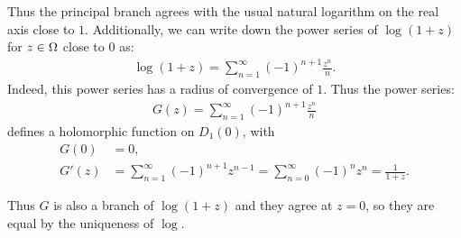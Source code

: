 Thus the principal branch agrees with the usual natural logarithm on the real axis close to $1$. Additionally, we can write down the power series of $\log(1+z)$ for $z \in \Omega$ close to $0$ as:
\begin{align*}
    \log(1+z) = \sum_{n=1}^\infty (-1)^{n+1} \frac{z^n}{n}.
\end{align*}
Indeed, this power series has a radius of convergence of $1$. Thus the power series:
\begin{align*}
    G(z) = \sum_{n=1}^\infty (-1)^{n+1} \frac{z^n}{n}
\end{align*}
defines a holomorphic function on $D_1(0)$, with
\begin{align*}
   G(0)&=0,\\
   G'(z) &= \sum_{n=1}^\infty (-1)^{n+1} z^{n-1} = \sum_{n=0}^\infty (-1)^n z^n= \frac{1}{1+z}.
\end{align*}

Thus $G$ is also a branch of $\log(1+z)$ and they agree at $z=0$, so they are equal by the uniqueness of $\log$.


